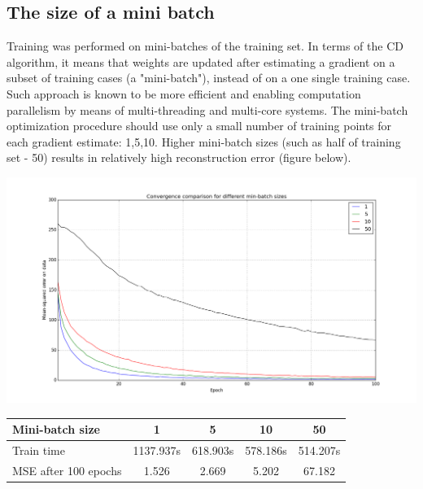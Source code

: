 \documentclass[a4paper]{scrartcl}
\begin{document}
\subsection{The size of a mini batch}
Training was performed on mini-batches of the training set. In terms of the CD algorithm, it means that weights are updated after estimating a gradient on a subset of training cases (a "mini-batch"), instead of on a one single training case. Such approach is known to be more efficient and enabling computation parallelism by means of multi-threading and multi-core systems. The mini-batch optimization procedure should use only a small number of training points for each gradient estimate: 1,5,10. Higher mini-batch sizes (such as half of training set - 50) results in relatively high reconstruction error (figure below). 
\begin{center}
\includegraphics[width=16cm]{images/batch.png}
\end{center}
\begin{center}
\hspace{1cm}
\begin{tabular}{|l||c|c|c|c|} \hline
Mini-batch size & 1 & 5 & 10 & 50
\\ \hline
Train time & 1137.937s & 618.903s & 578.186s & 514.207s
\\ \hline
MSE after 100 epochs & 1.526 & 2.669 & 5.202 & 67.182
\\ \hline \end{tabular}
\vspace{1cm}
\end{center}
\end{document}
